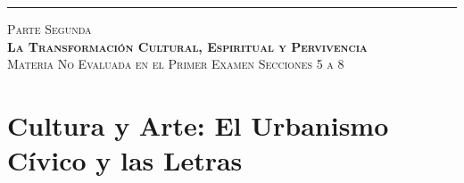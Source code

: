\documentclass[11pt,letterpaper]{article}
\begin{document}
\vspace{0.8em}
\noindent\rule{\linewidth}{0.4pt}
\vspace{0.8em}

\begin{center}
  {\Large\scshape\color{goodingWine} Parte Segunda}\\[0.2em]
  {\large\bfseries\scshape La Transformación Cultural, Espiritual y Pervivencia}\\[0.2em]
  {\footnotesize\color{goodingSlate}\textsc{Materia No Evaluada en el Primer Examen \quad\textbullet\quad Secciones 5 a 8}}
\end{center}
\vspace{0.4em}

\section{Cultura y Arte: El Urbanismo Cívico y las Letras}
\end{document}
